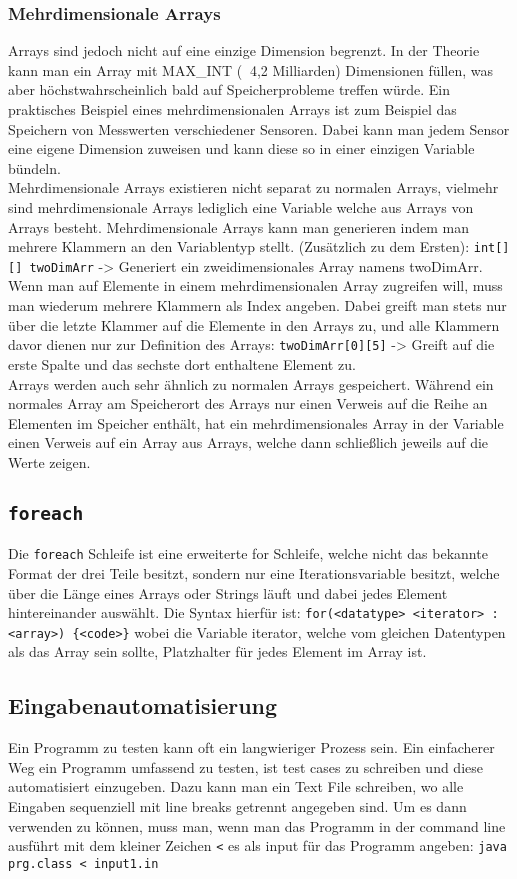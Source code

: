 \documentclass{article}
\begin{document}
	\subsubsection{Mehrdimensionale Arrays}
	Arrays sind jedoch nicht auf eine einzige Dimension begrenzt. In der Theorie kann man ein Array mit MAX\_INT ($~{}$ 4,2 Milliarden) Dimensionen füllen, was aber höchstwahrscheinlich bald auf Speicherprobleme treffen würde. Ein praktisches Beispiel eines mehrdimensionalen Arrays ist zum Beispiel das Speichern von Messwerten verschiedener Sensoren. Dabei kann man jedem Sensor eine eigene Dimension zuweisen und kann diese so in einer einzigen Variable bündeln. \\
	Mehrdimensionale Arrays existieren nicht separat zu normalen Arrays, vielmehr sind mehrdimensionale Arrays lediglich eine Variable welche aus Arrays von Arrays besteht. Mehrdimensionale Arrays kann man generieren indem man mehrere Klammern an den Variablentyp stellt. (Zusätzlich zu dem Ersten): \verb|int[][] twoDimArr| -> Generiert ein zweidimensionales Array namens twoDimArr. Wenn man auf Elemente in einem mehrdimensionalen Array zugreifen will, muss man wiederum mehrere Klammern als Index angeben. Dabei greift man stets nur über die letzte Klammer auf die Elemente in den Arrays zu, und alle Klammern davor dienen nur zur Definition des Arrays: \verb|twoDimArr[0][5]| -> Greift auf die erste Spalte und das sechste dort enthaltene Element zu. \\
	Arrays werden auch sehr ähnlich zu normalen Arrays gespeichert. Während ein normales Array am Speicherort des Arrays nur einen Verweis auf die Reihe an Elementen im Speicher enthält, hat ein mehrdimensionales Array in der Variable einen Verweis auf ein Array aus Arrays, welche dann schließlich jeweils auf die Werte zeigen.  
	\cprotect\subsection{\verb|foreach|}
	Die \verb|foreach| Schleife ist eine erweiterte for Schleife, welche nicht das bekannte Format der drei Teile besitzt, sondern nur eine Iterationsvariable besitzt, welche über die Länge eines Arrays oder Strings läuft und dabei jedes Element hintereinander auswählt. Die Syntax hierfür ist: \verb|for(<datatype> <iterator> : <array>) {<code>}| wobei die Variable iterator, welche vom gleichen Datentypen als das Array sein sollte, Platzhalter für jedes Element im Array ist.
	\subsection{Eingabenautomatisierung}
	Ein Programm zu testen kann oft ein langwieriger Prozess sein. Ein einfacherer Weg ein Programm umfassend zu testen, ist test cases zu schreiben und diese automatisiert einzugeben. Dazu kann man ein Text File schreiben, wo alle Eingaben sequenziell mit line breaks getrennt angegeben sind. Um es dann verwenden zu können, muss man, wenn man das Programm in der command line ausführt mit dem kleiner Zeichen \verb|<| es als input für das Programm angeben: \verb|java prg.class < input1.in| 
\end{document}
